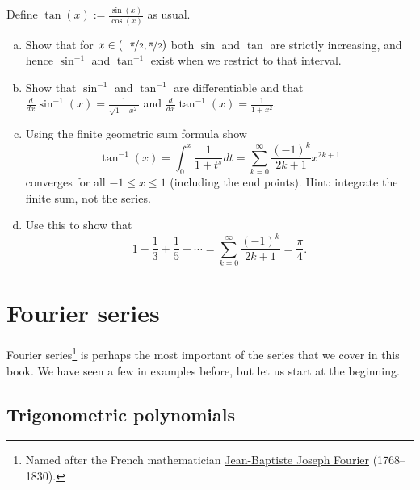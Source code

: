 \begin{exercise}
Define $\tan(x) := \frac{\sin(x)}{\cos(x)}$ as usual.
\begin{enumerate}[a)]
\item
Show that for $x \in (\nicefrac{-\pi}{2},\nicefrac{\pi}{2})$
both $\sin$ and $\tan$ are strictly increasing, and hence $\sin^{-1}$
and $\tan^{-1}$ exist when we restrict to that interval.
\item
Show that $\sin^{-1}$ and $\tan^{-1}$ are differentiable
and
that
$\frac{d}{dx} \sin^{-1}(x) = \frac{1}{\sqrt{1-x^2}}$ and
$\frac{d}{dx} \tan^{-1}(x) = \frac{1}{1+x^2}$.
\item
Using the finite geometric sum formula show
\begin{equation*}
\tan^{-1}(x) = \int_0^x \frac{1}{1+t^s} dt
=
\sum_{k=0}^\infty \frac{{(-1)}^k}{2k+1} x^{2k+1}
\end{equation*}
converges for all $-1 \leq x \leq 1$ (including the end points).
Hint: integrate the finite sum, not the series.
\item
Use this to show that
\begin{equation*}
1 - \frac{1}{3} + \frac{1}{5} - \cdots
=
\sum_{k=0}^\infty \frac{{(-1)}^k}{2k+1}
=
\frac{\pi}{4} .
\end{equation*}
\end{enumerate}
\end{exercise}


\sectionnewpage
\section{Fourier series}
\label{sec:fourier}


Fourier series\footnote{%
Named after the French mathematician
\href{http://en.wikipedia.org/wiki/Joseph_Fourier}{Jean-Baptiste Joseph Fourier}
(1768--1830).} is perhaps the most important of the series that we cover in
this book.  We have seen a few in examples before, but let us start
at the beginning.

\subsection{Trigonometric polynomials}

